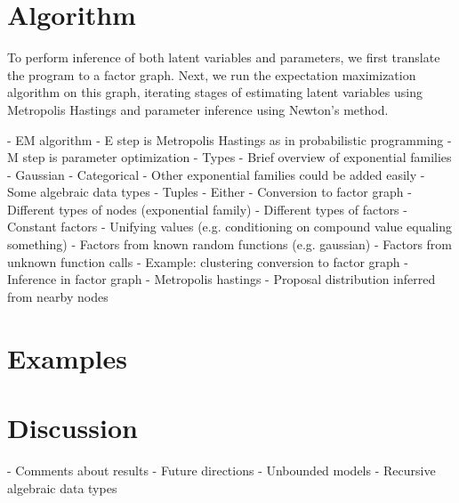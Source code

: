\documentclass[proceed]{article}
\begin{document}
  

  \section{Algorithm}

    To perform inference of both latent variables and parameters, we first
    translate the program to a factor graph.  Next, we run the
    expectation maximization algorithm on this graph, iterating stages of
    estimating latent variables using Metropolis Hastings and parameter
    inference using Newton's method.

    
  - EM algorithm
    - E step is Metropolis Hastings as in probabilistic programming
    - M step is parameter optimization
  - Types
    - Brief overview of exponential families
    - Gaussian
    - Categorical
    - Other exponential families could be added easily
    - Some algebraic data types
      - Tuples
      - Either
  - Conversion to factor graph
    - Different types of nodes (exponential family)
    - Different types of factors
      - Constant factors
      - Unifying values (e.g. conditioning on compound value equaling something)
      - Factors from known random functions (e.g. gaussian)
      - Factors from unknown function calls
    - Example: clustering conversion to factor graph
  - Inference in factor graph
    - Metropolis hastings
    - Proposal distribution inferred from nearby nodes

  \section{Examples}

  \section{Discussion}

  - Comments about results
  - Future directions
    - Unbounded models
    - Recursive algebraic data types
\end{document}
